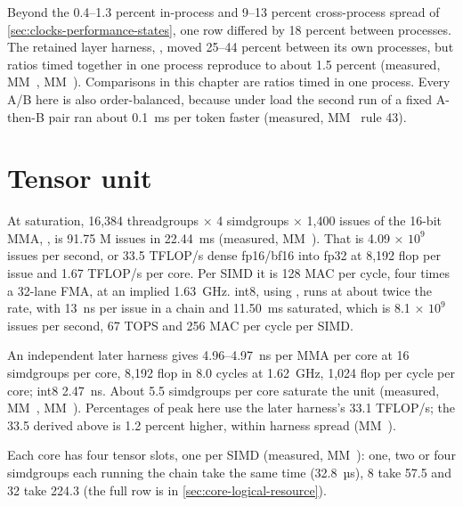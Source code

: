 Beyond the 0.4–1.3 percent in-process and 9–13 percent cross-process spread of \cref{sec:clocks-performance-states},
one row differed by 18 percent between processes. The retained layer harness, , moved 25–44 percent
between its own processes, but ratios timed together in one process reproduce to about 1.5 percent (measured,
MM~, MM~). Comparisons in this chapter are ratios timed in one process. Every A/B here is also
order-balanced, because under load the second run of a fixed A-then-B pair ran about 0.1~ms per token faster
(measured, MM~ rule 43).

\section{Tensor unit}\label{sec:tensor-issue-rate}

At saturation, 16,384 threadgroups × 4 simdgroups × 1,400 issues of the 16-bit MMA, , is 91.75 M issues in
22.44~ms (measured, MM~). That is 4.09 × $10^{9}$ issues per second, or 33.5 TFLOP/s dense fp16/bf16 into fp32 at
8,192 flop per issue and 1.67 TFLOP/s per core. Per SIMD it is 128 MAC per cycle, four times a 32-lane FMA, at an
implied 1.63~GHz. int8, using , runs at about twice the rate, with 13~ns per issue in a chain and 11.50~ms
saturated, which is 8.1 × $10^{9}$ issues per second, 67 TOPS and 256 MAC per cycle per SIMD.

An independent later harness gives 4.96–4.97~ns per MMA per core at 16 simdgroups per core, 8,192 flop in 8.0
cycles at 1.62~GHz, 1,024 flop per cycle per core; int8 2.47~ns. About 5.5 simdgroups per core saturate the unit
(measured, MM~, MM~). Percentages of peak here use the later harness's 33.1 TFLOP/s;
the 33.5 derived above is 1.2 percent higher, within harness spread (MM~).

Each core has four tensor slots, one per SIMD (measured, MM~): one, two or four simdgroups each running the
chain take the same time (32.8~µs), 8 take 57.5 and 32 take 224.3 (the full row is in \cref{sec:core-logical-resource}).

